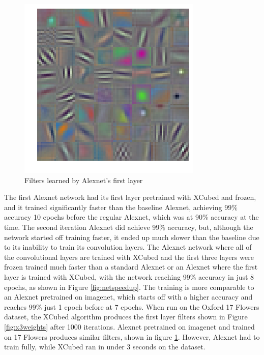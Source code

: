 \documentclass[twocolumn]{article}
\begin{document}
\begin{figure}[ht]
    \centering
    \includegraphics[width=.8\linewidth]{trainedfet}
    \caption{Filters learned by Alexnet's first layer}
    \label{fig:learnedweights}
\end{figure}
The first Alexnet network had its first layer pretrained with XCubed and frozen, and it trained significantly faster than the baseline Alexnet, achieving 99\% accuracy 10 epochs before the regular Alexnet, which was at 90\% accuracy at the time. The second iteration Alexnet did achieve 99\% accuracy, but, although the network started off training faster, it ended up much slower than the baseline due to its inability to train its convolution layers. The Alexnet network where all of the convolutional layers are trained with XCubed and the first three layers were frozen trained much faster than a standard Alexnet or an Alexnet where the first layer is trained with XCubed, with the network reaching 99\% accuracy in just 8 epochs, as shown in Figure \ref{fig:netspeedup}. The training is more comparable to an Alexnet pretrained on imagenet, which starts off with a higher accuracy and reaches 99\% just 1 epoch before at 7 epochs. When run on the Oxford 17 Flowers dataset, the XCubed algorithm produces the first layer filters shown in Figure \ref{fig:x3weights} after 1000 iterations. Alexnet pretrained on imagenet and trained on 17 Flowers produces similar filters, shown in figure \ref{fig:learnedweights}. However, Alexnet had to train fully, while XCubed ran in under 3 seconds on the dataset.
\end{document}

